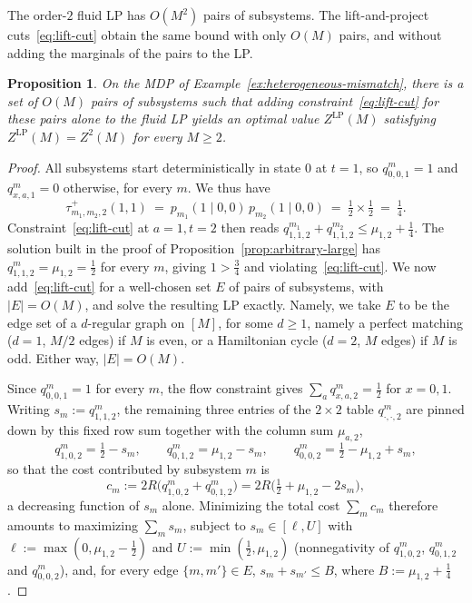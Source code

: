 \documentclass{article}
\newtheorem{proposition}{Proposition}
\begin{document}
The order-$2$ fluid LP has $O(M^2)$ pairs of subsystems. The
lift-and-project cuts~\eqref{eq:lift-cut} obtain the same bound with only $O(M)$ pairs, and without adding the
marginals of the pairs to the LP.

\begin{proposition}
\label{prop:lift-cut-closes-gap}
On the MDP of Example~\ref{ex:heterogeneous-mismatch}, there is a set of $O(M)$ pairs of subsystems such that adding
constraint~\eqref{eq:lift-cut} for these pairs alone to the fluid LP yields an optimal value $Z^{\mathrm{LP}}(M)$
satisfying $Z^{\mathrm{LP}}(M) = Z^2(M)$ for every $M \geq 2$.
\end{proposition}

\begin{proof}
All subsystems start deterministically in
state $0$ at $t=1$, so $q^m_{0,0,1}=1$ and $q^m_{x,a,1}=0$ otherwise, for every $m$. We thus have
\[
\tau^+_{m_1,m_2,2}(1,1) \ =\ p_{m_1}(1\mid0,0)\, p_{m_2}(1\mid0,0) \ =\ \tfrac12 \times \tfrac12 \ =\ \tfrac14.
\]
Constraint~\eqref{eq:lift-cut} at $a=1,t=2$ then reads $q^{m_1}_{1,1,2}+q^{m_2}_{1,1,2} \leq \mu_{1,2}+\tfrac14$. The solution
built in the proof of Proposition~\ref{prop:arbitrary-large} has $q^m_{1,1,2}=\mu_{1,2}=\tfrac12$ for every $m$, giving $1 > \tfrac34$ and
violating~\eqref{eq:lift-cut}. We now add~\eqref{eq:lift-cut} for a well-chosen set $E$ of pairs of
subsystems, with $|E| = O(M)$, and solve the resulting LP exactly. Namely, we take $E$ to be the
edge set of a $d$-regular graph on $[M]$, for some $d \geq 1$, namely a perfect matching ($d=1$, $M/2$
edges) if $M$ is even, or a Hamiltonian cycle ($d=2$, $M$ edges) if $M$ is odd. Either way, $|E| =
O(M)$.

Since $q^m_{0,0,1}=1$ for every $m$, the flow constraint gives $\sum_a q^m_{x,a,2} = \tfrac12$ for $x=0,1$. Writing $s_m := q^m_{1,1,2}$, the remaining three entries of the $2\times 2$ table $q^m_{\cdot,\cdot,2}$ are pinned down by this fixed row sum together with the column sum $\mu_{a,2}$,
\[
q^m_{1,0,2} = \tfrac12 - s_m, \qquad q^m_{0,1,2} = \mu_{1,2} - s_m, \qquad q^m_{0,0,2} = \tfrac12 - \mu_{1,2} + s_m,
\]
so that the cost contributed by subsystem $m$ is
\[
c_m := 2R\big(q^m_{1,0,2}+q^m_{0,1,2}\big) = 2R\big(\tfrac12 + \mu_{1,2} - 2 s_m\big),
\]
a decreasing function of $s_m$ alone. Minimizing the total cost $\sum_m c_m$ therefore amounts to maximizing $\sum_m s_m$, subject to $s_m \in [\ell,U]$ with $\ell := \max(0,\mu_{1,2}-\tfrac12)$ and $U := \min(\tfrac12,\mu_{1,2})$ (nonnegativity of $q^m_{1,0,2}$, $q^m_{0,1,2}$ and $q^m_{0,0,2}$), and, for every edge $\{m,m'\} \in E$, $s_m + s_{m'} \leq B$, where $B := \mu_{1,2}+\tfrac14$.


\end{proof}
\end{document}
